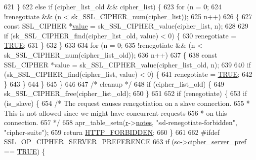 \begin{DoxyCode}
{621             \}
622             \textcolor{keywordflow}{else} \textcolor{keywordflow}{if} (cipher\_list\_old && cipher\_list) \{
623                 \textcolor{keywordflow}{for} (n = 0;
624                      !renegotiate && (n < sk\_SSL\_CIPHER\_num(cipher\_list));
625                      n++)
626                 \{
627                     \textcolor{keyword}{const} SSL\_CIPHER *\hyperlink{group__apr__env_ga711ebc0efad43aba10f32ded4a28cf17}{value} = sk\_SSL\_CIPHER\_value(cipher\_list, n);
628 
629                     \textcolor{keywordflow}{if} (sk\_SSL\_CIPHER\_find(cipher\_list\_old, value) < 0) \{
630                         renegotiate = \hyperlink{group__MOD__SSL__PRIVATE_gaa8cecfc5c5c054d2875c03e77b7be15d}{TRUE};
631                     \}
632                 \}
633 
634                 \textcolor{keywordflow}{for} (n = 0;
635                      !renegotiate && (n < sk\_SSL\_CIPHER\_num(cipher\_list\_old));
636                      n++)
637                 \{
638                     \textcolor{keyword}{const} SSL\_CIPHER *value = sk\_SSL\_CIPHER\_value(cipher\_list\_old, n);
639 
640                     \textcolor{keywordflow}{if} (sk\_SSL\_CIPHER\_find(cipher\_list, value) < 0) \{
641                         renegotiate = \hyperlink{group__MOD__SSL__PRIVATE_gaa8cecfc5c5c054d2875c03e77b7be15d}{TRUE};
642                     \}
643                 \}
644             \}
645         \}
646 
647         \textcolor{comment}{/* cleanup */}
648         \textcolor{keywordflow}{if} (cipher\_list\_old) \{
649             sk\_SSL\_CIPHER\_free(cipher\_list\_old);
650         \}
651 
652         \textcolor{keywordflow}{if} (renegotiate) \{
653             \textcolor{keywordflow}{if} (is\_slave) \{
654                 \textcolor{comment}{/* The request causes renegotiation on a slave connection.}
655 \textcolor{comment}{                 * This is not allowed since we might have concurrent requests}
656 \textcolor{comment}{                 * on this connection.}
657 \textcolor{comment}{                 */}
658                 apr\_table\_setn(\hyperlink{group__APACHE__CORE__CONFIG_ga091cdd45984e865a888a4f8bb8fe107a}{r}->\hyperlink{structrequest__rec_a8be66d4328766cf1da8913c9b51e0e30}{notes}, \textcolor{stringliteral}{"ssl-renegotiate-forbidden"}, \textcolor{stringliteral}{"cipher-suite"});
659                 \textcolor{keywordflow}{return} \hyperlink{group__HTTP__Status_ga92646f876056a1e5013e0050496dc04d}{HTTP\_FORBIDDEN};
660             \}
661             
662 \textcolor{preprocessor}{#ifdef SSL\_OP\_CIPHER\_SERVER\_PREFERENCE}
663             \textcolor{keywordflow}{if} (sc->\hyperlink{structSSLSrvConfigRec_a8dca1370c92ffd4ea5e34b761450c1d5}{cipher\_server\_pref} == \hyperlink{group__MOD__SSL__PRIVATE_gaa8cecfc5c5c054d2875c03e77b7be15d}{TRUE}) \{
}
\end{DoxyCode}

